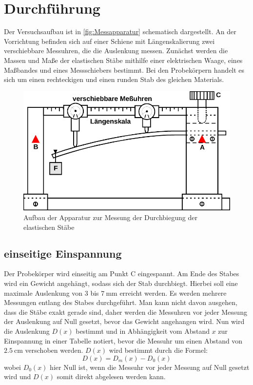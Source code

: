 \section{Durchführung}
\label{sec:Durchführung}

Der Versuchsaufbau ist in \autoref{fig:Messapparatur} schematisch dargestellt.
An der Vorrichtung befinden sich auf einer Schiene mit Längenskalierung zwei verschiebbare Messuhren, die die Auslenkung messen.
Zunächst werden die Massen und Maße der elastischen Stäbe mithilfe einer elektrischen Waage, eines Maßbandes und eines Messschiebers bestimmt.
Bei den Probekörpern handelt es sich um einen rechteckigen und einen runden Stab des gleichen Materials. 


\begin{figure}
    \centering
    \includegraphics{content/Messapparat.pdf}
    \caption{Aufbau der Apparatur zur Messung der Durchbiegung der elastischen Stäbe\cite[111]{V103}}
    \label{fig:Messapparatur}
\end{figure}

\subsection{einseitige Einspannung}
Der Probekörper wird einseitig am Punkt C eingespannt. 
Am Ende des Stabes wird ein Gewicht angehängt, sodass sich der Stab durchbiegt. 
Hierbei soll eine maximale Auslenkung von $\num{3}$ bis $\qty{7}{\milli\meter}$ erreicht werden.
Es werden mehrere Messungen entlang des Stabes durchgeführt.
Man kann nicht davon ausgehen, dass die Stäbe exakt gerade sind, daher werden die Messuhren vor jeder Messung der Auslenkung auf Null gesetzt,
bevor das Gewicht angehangen wird.
Nun wird die Auslenkung $D(x)$ bestimmt und in Abhängigkeit vom Abstand $x$ zur Einspannung in einer Tabelle notiert, 
bevor die Messuhr um einen Abstand von $\qty{2,5}{\centi\meter}$ verschoben werden.
$D(x)$ wird bestimmt durch die Formel:
\begin{equation}
    D(x) = D_m(x) - D_0(x)
    \label{eqn:D(x)1}
\end{equation}
wobei $D_0(x)$ hier Null ist, wenn die Messuhr vor jeder Messung auf Null gesetzt wird und $D(x)$ somit direkt abgelesen werden kann.

